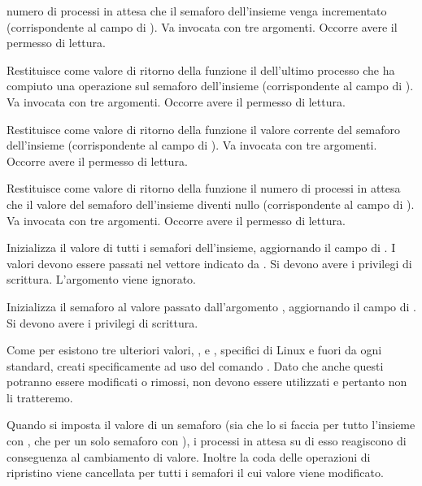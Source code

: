 \begin{basedescript}{\desclabelwidth{1.6cm}\desclabelstyle{\nextlinelabel}}
  numero di processi in attesa che il semaforo  dell'insieme
   venga incrementato (corrispondente al campo  di
  ). Va invocata con tre argomenti.  Occorre avere il permesso di
  lettura.
\item[\constd{GETPID}] Restituisce come valore di ritorno della funzione il
   dell'ultimo processo che ha compiuto una operazione sul semaforo
   dell'insieme  (corrispondente al campo
   di ). Va invocata con tre argomenti.  Occorre avere
  il permesso di lettura.
\item[\constd{GETVAL}] Restituisce come valore di ritorno della funzione il 
  valore corrente del semaforo  dell'insieme 
  (corrispondente al campo  di ). Va invocata con tre
  argomenti.  Occorre avere il permesso di lettura.
\item[\constd{GETZCNT}] Restituisce come valore di ritorno della funzione il
  numero di processi in attesa che il valore del semaforo 
  dell'insieme  diventi nullo (corrispondente al campo
   di ). Va invocata con tre argomenti.  Occorre
  avere il permesso di lettura.
\item[\constd{SETALL}] Inizializza il valore di tutti i semafori dell'insieme,
  aggiornando il campo  di . I valori devono
  essere passati nel vettore indicato da .  Si devono avere i
  privilegi di scrittura.  L'argomento  viene ignorato.
\item[\constd{SETVAL}] Inizializza il semaforo  al valore passato
  dall'argomento , aggiornando il campo  di
  .  Si devono avere i privilegi di scrittura.
\end{basedescript}

Come per  esistono tre ulteriori valori, ,
 e , specifici di Linux e fuori da ogni
standard, creati specificamente ad uso del comando . Dato che anche
questi potranno essere modificati o rimossi, non devono essere utilizzati e
pertanto non li tratteremo.

Quando si imposta il valore di un semaforo (sia che lo si faccia per tutto
l'insieme con , che per un solo semaforo con ), i
processi in attesa su di esso reagiscono di conseguenza al cambiamento di
valore.  Inoltre la coda delle operazioni di ripristino viene cancellata per
tutti i semafori il cui valore viene modificato.

